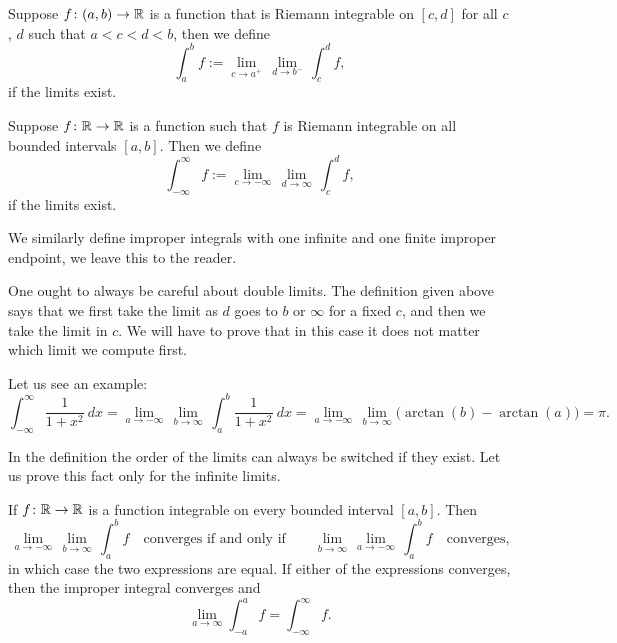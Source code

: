 \begin{defn}
Suppose $f \colon (a,b) \to {\mathbb{R}}$ is a function
that is Riemann integrable on $[c,d]$ for all $c$, $d$
such that $a < c < d < b$, then we define
\begin{equation*}
\int_a^b f := \lim_{c \to a^+} \, \lim_{d \to b^-} \, \int_{c}^{d} f ,
\end{equation*}
if the limits exist.

Suppose $f \colon {\mathbb{R}} \to {\mathbb{R}}$ is a function such that
$f$ is Riemann integrable on all bounded intervals $[a,b]$.  Then
we define
\begin{equation*}
\int_{-\infty}^\infty f := \lim_{c \to -\infty} \, \lim_{d \to \infty} \, \int_c^d f ,
\end{equation*}
if the limits exist.

We similarly define improper integrals with one infinite and one finite
improper endpoint, we leave this to the reader.
\end{defn}

One ought to always be careful about double limits.  The definition
given above says that we first take the limit as $d$ goes to $b$ or
$\infty$ for a fixed $c$, and then we take the limit in $c$.
We will have to prove that in this case it does not matter which limit
we compute first.

\begin{example}
Let us see an example:
\begin{equation*}
\int_{-\infty}^\infty \frac{1}{1+x^2} ~ dx
=
\lim_{a \to -\infty} \, \lim_{b \to \infty} \,
\int_{a}^b \frac{1}{1+x^2} ~ dx
=
\lim_{a \to -\infty} \, \lim_{b \to \infty}
\bigl( \arctan(b) - \arctan(a) \bigr)
=
\pi .
\end{equation*}
\end{example}

In the definition the order of the limits can always be switched if they
exist.  Let us prove this fact only for the infinite limits.

\begin{prop}
If $f \colon {\mathbb{R}} \to {\mathbb{R}}$ is a function integrable on every bounded interval
$[a,b]$.
Then 
\begin{equation*}
\lim_{a \to -\infty} \, \lim_{b \to \infty} \, \int_a^b f
\quad \text{converges if and only if} \qquad
\lim_{b \to \infty}
\,
\lim_{a \to -\infty}
\,
\int_a^b f
\quad
\text{converges,}
\end{equation*}
in which case the two
expressions are equal.  If either of the
expressions converges, then the improper integral converges and
\begin{equation*}
\lim_{a\to\infty}
\int_{-a}^a f
=
\int_{-\infty}^\infty f .
\end{equation*}
\end{prop}


